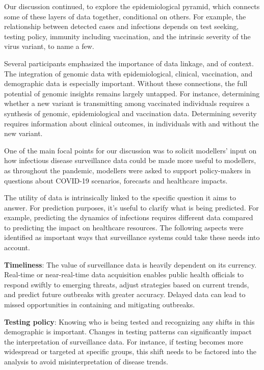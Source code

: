 Our discussion continued, to explore the epidemiological pyramid, which connects some of these layers of data together, conditional on others. For example, the relationship between detected cases and infections depends on test seeking, testing policy, immunity including vaccination, and the intrinsic severity of the virus variant, to name a few.

Several participants emphasized the importance of data linkage, and of context.  The integration of genomic data with epidemiological, clinical, vaccination, and demographic data is especially important. Without these connections, the full potential of genomic insights remains largely untapped. For instance, determining whether a new variant is transmitting among vaccinated individuals requires a synthesis of genomic, epidemiological and vaccination data. Determining severity requires information about clinical outcomes, in individuals with and without the new variant.

One of the main focal points for our discussion was to solicit modellers' input on how infectious disease surveillance data could be made more useful to modellers, as throughout the pandemic, modellers were asked to support policy-makers in questions about COVID-19 scenarios, forecasts and healthcare impacts.

The utility of data is intrinsically linked to the specific question it aims to answer. For prediction purposes, it’s useful to clarify what is being predicted. For example, predicting the dynamics of infections requires different data compared to predicting the impact on healthcare resources. The following aspects were identified as important ways that surveillance systems could take these needs into account.  

{\bf Timeliness}: The value of surveillance data is heavily dependent on its currency. Real-time or near-real-time data acquisition enables public health officials to respond swiftly to emerging threats, adjust strategies based on current trends, and predict future outbreaks with greater accuracy. Delayed data can lead to missed opportunities in containing and mitigating outbreaks.

{\bf Testing policy}: Knowing who is being tested and recognizing any shifts in this demographic is important. Changes in testing patterns can significantly impact the interpretation of surveillance data. For instance, if testing becomes more widespread or targeted at specific groups, this shift needs to be factored into the analysis to avoid misinterpretation of disease trends.

